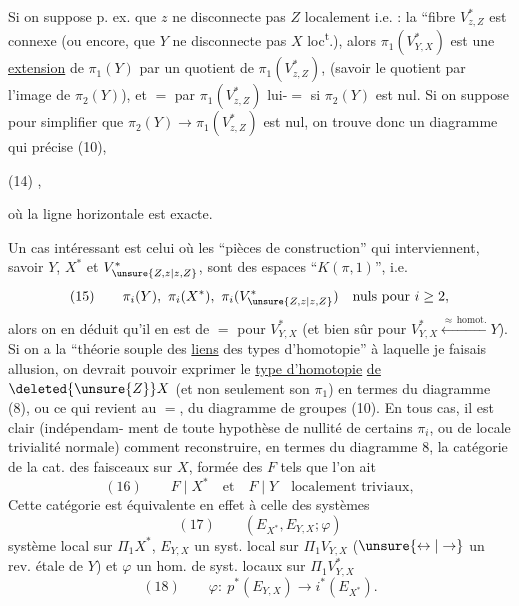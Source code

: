Si on suppose p. ex. que $z$ ne disconnecte
pas $Z$ localement i.e. :  la ``fibre $V^*_{z,Z}$ est connexe
(ou encore, que $Y$ ne disconnecte pas $X$
loc\textsuperscript{t}.), alors $\pi_1(V^*_{Y,X})$ est une \uline{extension}
de $\pi_1(Y)$ par un quotient de $\pi_1(V^*_{z,Z})$, 
(savoir le quotient par l'image de $\pi_2(Y)$),
et $=$ par $\pi_1(V^*_{z,Z})$ lui-$=$ si $\pi_2(Y)$ est
nul. Si on suppose pour simplifier
que $\pi_2(Y)\longrightarrow\pi_1(V^*_{z,Z})$ est nul, on trouve
donc un diagramme qui précise (10),

\noindent (14)
,

où la ligne horizontale est exacte.

Un cas intéressant est celui où les
``pièces de construction'' qui  interviennent,
savoir $Y$, $X^*$ et $V^*_{\unsure{Z,z|z,Z}}$, sont des espaces
``$K(\pi,1)$'', i.e.
\[
(15)\qquad \pi_i(Y),\ \pi_i(X^*),\ \pi_i(V^*_{\unsure{Z,z|z,Z}})\quad\text{nuls pour }i\geq 2,
\]
alors on en déduit qu'il en est de $=$
pour $V^*_{Y,X}$ (et bien sûr pour $V^*_{Y,X}\xleftarrow{\approx\,\mathrm{homot.}}Y$).
Si on a la ``théorie souple des \uline{liens} des
types d'homotopie'' à laquelle je faisais
allusion, on devrait pouvoir exprimer 
le \uline{type d'homotopie} \uline{de} $\deleted{\unsure{Z}}X$
(et non seulement son $\pi_1$) en termes du
diagramme  (8), ou ce qui revient au
$=$, du diagramme de groupes (10).
En tous cas, il est clair (indépendam-
ment de toute hypothèse de nullité de
certains $\pi_i$, ou de locale trivialité normale)
comment reconstruire, en termes du
diagramme 8, la  catégorie  de la cat. des
faisceaux sur $X$,  formée des $F$ tels
que l'on ait
\[
(16)\qquad F\mid X^*\quad\text{et}\quad F\mid Y\quad\text{localement triviaux},
\]
Cette catégorie  est équivalente en effet
à celle des systèmes
\[
(17)\qquad (E_{X^*},E_{Y,X};\varphi)
\]
 système local sur $\Pi_1 X^*$, $E_{Y,X}$ un
syst. local sur $\Pi_1 V_{Y,X}$ ($\unsure{\leftrightarrow|\rightarrow}$ un rev. étale
de $Y$) et $\varphi$ un hom. de syst. locaux sur $\Pi_1V^*_{Y,X}$
\[
(18)\qquad \varphi:\ p^*(E_{Y,X})\longrightarrow i^*(E_{X^*}).
\]

